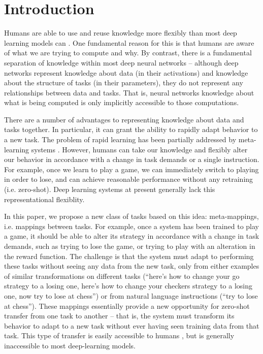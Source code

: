 \documentclass{article}
\begin{document}
\section{Introduction}
Humans are able to use and reuse knowledge more flexibly than most deep learning models can \citep[e.g.][]{Lake2016}. One fundamental reason for this is that humans are aware of what we are trying to compute and why. By contrast, there is a fundamental separation of knowledge within most deep neural networks -- although deep networks represent knowledge about data (in their activations) and knowledge about the structure of tasks (in their parameters), they do not represent any relationships between data and tasks. That is, neural networks knowledge about what is being computed is only implicitly accessible to those computations. \par
There are a number of advantages to representing knowledge about data and tasks together. In particular, it can grant the ability to rapidly adapt behavior to a new task. The problem of rapid learning has been partially addressed by meta-learning systems \citep[e.g.][]{Vinyals2016, Finn2017a}. However, humans can take our knowledge and flexibly alter our behavior in accordance with a change in task demands or a single instruction. For example, once we learn to play a game, we can immediately switch to playing in order to lose, and can achieve reasonable performance without any retraining (i.e. zero-shot). Deep learning systems at present generally lack this representational flexiblity. \par
In this paper, we propose a new class of tasks based on this idea: meta-mappings, i.e. mappings between tasks. For example, once a system has been trained to play a game, it should be able to alter its strategy in accordance with a change in task demands, such as trying to lose the game, or trying to play with an alteration in the reward function. The challenge is that the system must adapt to performing these tasks without seeing any data from the new task, only from either examples of similar transformations on different tasks (``here's how to change your go strategy to a losing one, here's how to change your checkers strategy to a losing one, now try to lose at chess'') or from natural language instructions (``try to lose at chess''). These mappings essentially provide a new opportunity for zero-shot transfer from one task to another -- that is, the system must transform its behavior to adapt to a new task without ever having seen training data from that task. This type of transfer is easily accessible to humans \citep{Lake2016}, but is generally inaccessible to most deep-learning models. \par
\end{document}
